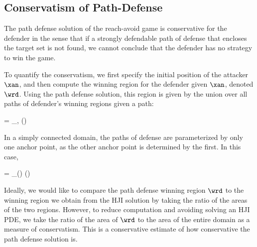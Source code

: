 \subsection{Conservatism of Path-Defense}
The path defense solution of the reach-avoid game is conservative for the defender in the sense that if a strongly defendable path of defense that encloses the target set is not found, we cannot conclude that the defender has no strategy to win the game. 

To quantify the conservatism, we first specify the initial position of the attacker $\xan$, and then compute the winning region for the defender given $\xan$, denoted $\wrd$. Using the path defense solution, this region is given by the union over all paths of defender's winning regions given a path:

\bq
\wrd = \bigcup_{\apa,\apb} (\rpd)
\eq

In a simply connected domain, the paths of defense are parameterized by only one anchor point, as the other anchor point is determined by the first. In this case, 

\bq
\wrd = \bigcup_{\apa(\apb)} (\rpd)
\eq

Ideally, we would like to compare the path defense winning region $\wrd$ to the winning region we obtain from the HJI solution by taking the ratio of the areas of the two regions. However, to reduce computation and avoiding solving an HJI PDE, we take the ratio of the area of $\wrd$ to the area of the entire domain as a measure of conservatism. This is a conservative estimate of how conservative the path defense solution is.